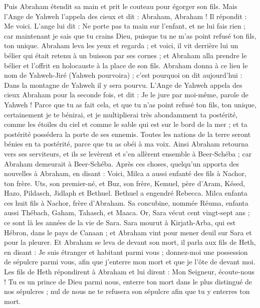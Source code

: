 \begin{multicols}{2}
Puis Abraham étendit sa main et prit le couteau pour égorger son fils.
Mais l'Ange de Yahweh l’appela des cieux et dit : Abraham, Abraham ! Il répondit : Me voici.
L’ange lui dit : Ne porte pas ta main sur l'enfant, et ne lui fais rien ; car maintenant je sais que tu crains Dieu, puisque tu ne m’as point refusé ton fils, ton unique.
Abraham leva les yeux et regarda ; et voici,  il vit derrière lui un bélier qui était retenu à un buisson par ses cornes ; et Abraham alla prendre le bélier et l'offrit en holocauste à la place de son fils.
Abraham donna à ce lieu le nom de Yahweh-Jiré (Yahweh pourvoira) ; c'est pourquoi on dit aujourd'hui : Dans la montagne de Yahweh il y sera pourvu.
L'Ange de Yahweh appela des cieux Abraham pour la seconde fois,
et dit : Je le jure par moi-même, parole de Yahweh ! Parce que tu as fait cela, et que tu n'as point refusé ton fils, ton unique,
certainement je te bénirai, et je multiplierai très abondamment ta postérité, comme les étoiles du ciel et comme le sable qui est sur le bord de la mer ; et ta postérité possédera la porte de ses ennemis.
Toutes les nations de la terre seront bénies en ta postérité, parce que tu as obéi à ma voix.
Ainsi Abraham retourna vers ses serviteurs, et ils se levèrent et s'en allèrent ensemble à Beer-Schéba ; car Abraham demeurait à Beer-Schéba.
Après ces choses, quelqu'un apporta des nouvelles à Abraham, en disant : Voici, Milca a aussi enfanté des fils à Nachor, ton frère.
Uts, son premier-né, et Buz, son frère, Kemuel, père d'Aram,
Késed, Hazo, Pildasch, Jidlaph et Bethuel.
Bethuel a engendré Rebecca. Milca enfanta ces huit fils à Nachor, frère d'Abraham.
Sa concubine, nommée Réuma, enfanta aussi Thébach, Gaham, Tahasch, et Maaca.
\VerseOne{}Or, Sara vécut cent vingt-sept ans ; ce sont là les années de la vie de Sara.
Sara mourut à Kirjath-Arba, qui est Hébron, dans le pays de Canaan ; et Abraham vint pour mener deuil sur Sara et pour la pleurer.
Et Abraham se leva de devant son mort, il parla aux fils de Heth, en disant :
Je suis étranger et habitant parmi vous ; donnez-moi une possession de sépulcre parmi vous, afin que j'enterre mon mort et que je l'ôte de devant moi.
Les fils de Heth répondirent à Abraham et lui dirent :
Mon Seigneur, écoute-nous ! Tu es un prince de Dieu parmi nous, enterre ton mort dans le plus distingué de nos sépulcres ; nul de nous ne te refusera son sépulcre afin que tu y enterres ton mort.

\end{multicols}
